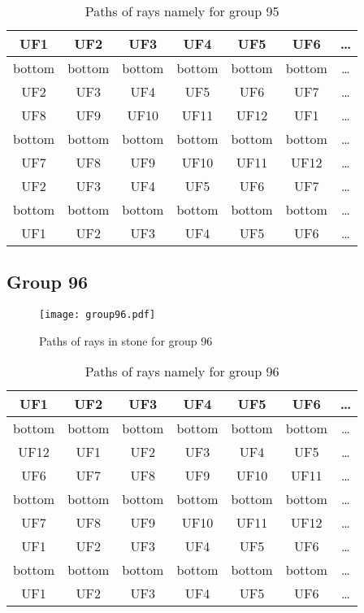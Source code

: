 \begin{table}[h!]
\centering
\begin{tabular}{|c|c|c|c|c|c|c|}
\hline
UF1 & UF2 & UF3 & UF4 & UF5 & UF6 & \dots \\
\hline
bottom & bottom & bottom & bottom & bottom & bottom & \dots \\
\hline
UF2 & UF3 & UF4 & UF5 & UF6 & UF7 & \dots \\
\hline
UF8 & UF9 & UF10 & UF11 & UF12 & UF1 & \dots \\
\hline
bottom & bottom & bottom & bottom & bottom & bottom & \dots \\
\hline
UF7 & UF8 & UF9 & UF10 & UF11 & UF12 & \dots \\
\hline
UF2 & UF3 & UF4 & UF5 & UF6 & UF7 & \dots \\
\hline
bottom & bottom & bottom & bottom & bottom & bottom & \dots \\
\hline
UF1 & UF2 & UF3 & UF4 & UF5 & UF6 & \dots \\
\hline
\end{tabular}
\caption{Paths of rays namely for group 95}
\label{table:TableGroup95}
\end{table}
\newpage
\subsection*{Group 96}






\begin{figure}[h!]
\centering
\texttt{[image: group96.pdf]}
\caption{Paths of rays in stone for group 96}
\label{table:FigGroup96}
\end{figure}



\begin{table}[h!]
\centering
\begin{tabular}{|c|c|c|c|c|c|c|}
\hline
UF1 & UF2 & UF3 & UF4 & UF5 & UF6 & \dots \\
\hline
bottom & bottom & bottom & bottom & bottom & bottom & \dots \\
\hline
UF12 & UF1 & UF2 & UF3 & UF4 & UF5 & \dots \\
\hline
UF6 & UF7 & UF8 & UF9 & UF10 & UF11 & \dots \\
\hline
bottom & bottom & bottom & bottom & bottom & bottom & \dots \\
\hline
UF7 & UF8 & UF9 & UF10 & UF11 & UF12 & \dots \\
\hline
UF1 & UF2 & UF3 & UF4 & UF5 & UF6 & \dots \\
\hline
bottom & bottom & bottom & bottom & bottom & bottom & \dots \\
\hline
UF1 & UF2 & UF3 & UF4 & UF5 & UF6 & \dots \\
\hline
\end{tabular}
\caption{Paths of rays namely for group 96}
\label{table:TableGroup96}
\end{table}
\newpage
